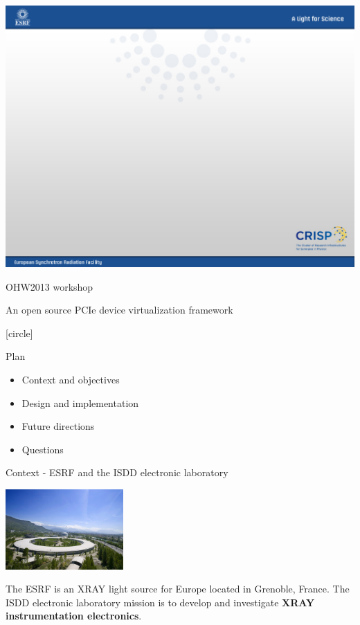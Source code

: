 \documentclass{beamer}
\begin{document}
\usebackgroundtemplate
{
\includegraphics[height=\paperheight,width=\paperwidth]{pic/esrf_crisp/esrf_crisp_default.jpeg}
}

\begin{frame}{OHW2013 workshop}
\begin{center}
An open source PCIe device virtualization framework
\end{center}
\end{frame}

[circle]
\begin{frame}{Plan}
  \begin{itemize}
  \item Context and objectives
  \item Design and implementation
  \item Future directions
  \item Questions
  \end{itemize}
\end{frame}


\begin{frame}{Context - ESRF and the ISDD electronic laboratory}
  \begin{center}
    \includegraphics[width=45mm]{pic/dv_esrf/main.jpg}
  \end{center}
  \begin{small}
    The ESRF is an XRAY light source for Europe located in Grenoble, France.
    The ISDD electronic laboratory mission is to develop and investigate
    \textbf{XRAY instrumentation electronics}.
  \end{small}
\end{frame}
\end{document}
